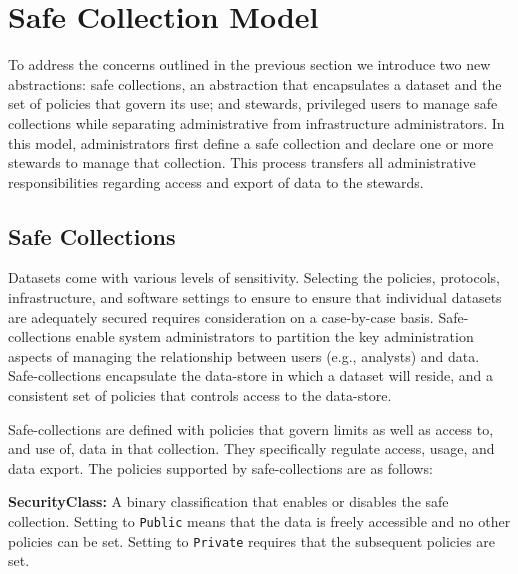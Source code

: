 \section{Safe Collection Model}
\label{sec:architecture}


To address the concerns outlined in the previous section we introduce two
new abstractions: safe collections, an abstraction that encapsulates
a dataset and the set of policies that govern its use; and stewards, privileged users
to manage safe collections while separating administrative from infrastructure
administrators.  
In this model, administrators first define a safe collection and declare one 
or more stewards to manage that collection. This process transfers
all administrative responsibilities regarding access and export of data to the stewards.

\subsection{Safe Collections}

Datasets come with various levels of sensitivity. Selecting the policies, protocols, infrastructure, and 
software settings to ensure to ensure that individual datasets are adequately secured requires consideration
on a case-by-case basis. 
Safe-collections enable system administrators to partition the key administration
aspects of managing the relationship between users (e.g., analysts) and data. 
Safe-collections encapsulate the data-store in which a dataset will reside, and a consistent set of policies
that controls access to the data-store.

 
Safe-collections are defined with policies that govern limits as well as access to, and use of, 
data in that collection. They specifically regulate access, usage, and data export.
The policies supported by safe-collections are as follows: 

\textbf{SecurityClass:} A binary classification that enables or disables
the safe collection. Setting to \texttt{Public} means that the data is freely
accessible and no other policies can be set.  Setting to \texttt{Private}
requires that the subsequent policies are set. 

